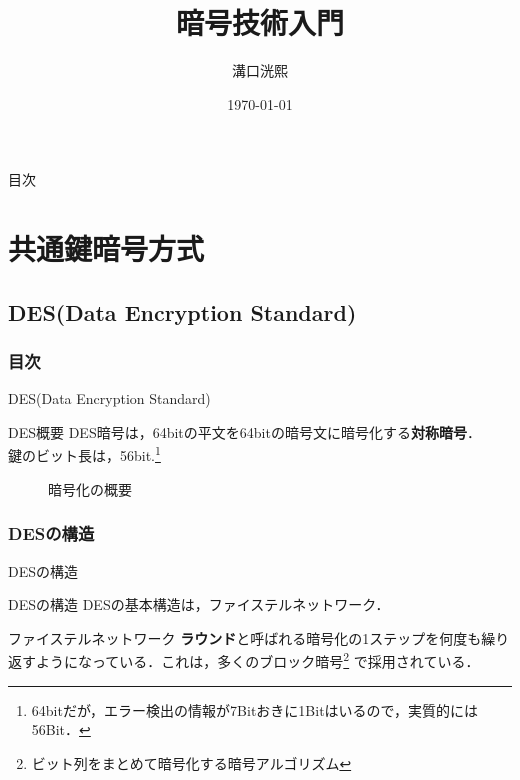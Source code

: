 \documentclass[dvipdfmx]{beamer}
\title[暗号技術入門]{暗号技術入門}
\author[K.MIZOGUCHI]{溝口洸熙}
\date{\today}
\institute[KUT]{高知工科大学 情報学群}
\begin{document}
\begin{frame}
\titlepage
\end{frame}
\begin{frame}{目次}
    \tableofcontents
\end{frame}

\section{共通鍵暗号方式}
\subsection{DES(Data Encryption Standard)}
\begin{frame}
\frametitle{目次}
\tableofcontents[currentsection,sectionstyle=show/shaded,subsectionstyle=show/shaded]
\end{frame}
\begin{frame}{DES(Data Encryption Standard)}
    \begin{block}{DES概要}
        DES暗号は，64bitの平文を64bitの暗号文に暗号化する\textbf{対称暗号}．\\
        鍵のビット長は，56bit.\footnote{64bitだが，エラー検出の情報が7Bitおきに1Bitはいるので，実質的には56Bit．}
    \end{block}
    \begin{figure}[b]
        \centering
        \caption{暗号化の概要}
        \label{fig:暗号化の概要}
        
    \end{figure}
\end{frame}
\subsubsection{DESの構造}
\begin{frame}{DESの構造}
    \begin{block}{DESの構造}
        DESの基本構造は，ファイステルネットワーク．
    \end{block}
    \begin{block}{ファイステルネットワーク}
        \textbf{ラウンド}と呼ばれる暗号化の1ステップを何度も繰り返すようになっている．これは，多くのブロック暗号\footnote{ビット列をまとめて暗号化する暗号アルゴリズム} で採用されている．\\
    \end{block}
\end{frame}
\end{document}
